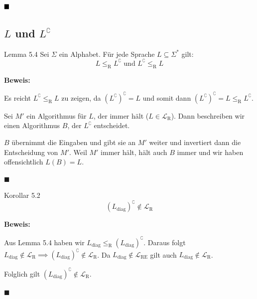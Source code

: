 \documentclass[a4paper, 11pt]{article}
\def\L{\mathcal{L}}
\def\Lre{\mathcal{L}_\text{RE}}
\def\Lr{\mathcal{L}_\text{R}}
\begin{document}
                $\hfill\blacksquare$
            
            
            
                \subsection{$L$ und $L^\complement$}

                \begin{mainbox}{Lemma 5.4}
                    Sei $\Sigma$ ein Alphabet. Für jede Sprache $L \subseteq \Sigma^*$ gilt:
                 $$L \leq_\text{R} L^\complement \text{ und } L^\complement \leq_\text{R} L$$
                \end{mainbox}
                \textbf{Beweis: }
            
                Es reicht $L^\complement \leq_\text{R} L$ zu zeigen, da $(L^\complement)^\complement = L$ und somit dann $(L^\complement)^\complement = L \leq_\text{R} L^\complement$.
            
                Sei $M'$ ein Algorithmus für $L$, der immer hält ($L \in \L_\text{R}$). Dann beschreiben wir einen Algorithmus $B$, der $L^\complement$ entscheidet. 
                
                $B$ übernimmt die Eingaben und gibt sie an $M'$ weiter und invertiert dann die Entscheidung von $M'$. Weil $M'$ immer hält, hält auch $B$ immer und wir haben offensichtlich $L(B) = L$.
            
                \hspace*{0pt}\hfill$\blacksquare$
            
                
                \begin{subbox}{Korollar 5.2}
                    $$(L_\text{diag})^\complement \notin \L_\text{R}$$
                \end{subbox}
                
                \textbf{Beweis:} 
                
                Aus Lemma 5.4 haben wir $L_\text{diag} \leq_\text{R} (L_\text{diag})^\complement$. Daraus folgt $L_\text{diag} \notin \Lr \implies (L_\text{diag})^\complement \notin \Lr$.
                Da $L_\text{diag} \notin \Lre$ gilt auch $L_\text{diag} \notin \Lr$. 
                
                Folglich gilt $(L_\text{diag})^\complement \notin \Lr$.
            
                \hspace*{0pt}\hfill$\blacksquare$
            
\end{document}
